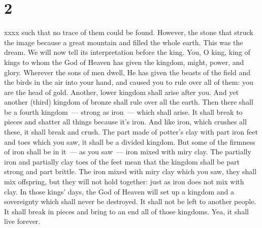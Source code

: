 \section{2}
\begin{enumerate}[align=center]
     xxxx such that no trace of them could be found. However, the stone that struck the image because a great mountain and filled the whole earth.%
     This was the dream. We will now tell its interpretation before the king.%
     You, O king, king of kings to whom the God of Heaven has given the kingdom, might, power, and glory.%
     Wherever the sons of men dwell, He has given the beasts of the field and the birds in the air into your hand, and caused you to rule over all of them: you are the head of gold.%
     Another, lower kingdom shall arise after you. And yet another (third) kingdom of bronze shall rule over all the earth.%
     Then there shall be a fourth kingdom~--- strong as iron~--- which shall arise. It shall break to pieces and shatter all things because it's iron. And like iron, which crushes all these, it shall break and crush.%
     The part made of potter's clay with part iron feet and toes which you saw, it shall be a divided kingdom. But some of the firmness of iron shall be in it~--- as you saw~--- iron mixed with miry clay.%
     The partially iron and partially clay toes of the feet mean that the kingdom shall be part strong and part brittle.%
     The iron mixed with miry clay which you saw, they shall mix offspring, but they will not hold together: just as iron does not mix with clay.%
     In those kings' days, the God of Heaven will set up a kingdom and a sovereignty which shall never be destroyed. It shall not be left to another people. It shall break in pieces and bring to an end all of those kingdoms. Yea, it shall live forever.%

\end{enumerate}
